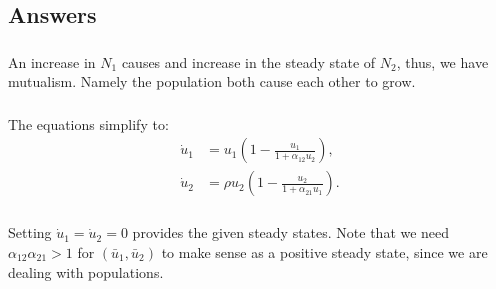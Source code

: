 \documentclass[]{article}
\renewcommand{\l}{\left(}
\renewcommand{\r}{\right)}
\begin{document}
\begin{Answ}
\subsection{Answers}
\subsubsection{}
An increase in $N_1$ causes and increase in the steady state of $N_2$, thus, we have mutualism. Namely the population both cause each other to grow.
\subsubsection{}
The equations simplify to:
\begin{align}
\dot{u}_1&=u_1\l 1-\frac{u_1}{1+\alpha_{12}u_2}\r,\\
\dot{u}_2&=\rho u_2\l 1-\frac{u_2}{1+\alpha_{21}u_1}\r.
\end{align}
\subsubsection{}
Setting $\dot{u}_1=\dot{u}_2=0$ provides the given steady states. Note that we need $\alpha_{12}\alpha_{21}>1$ for $(\bar{u}_1,\bar{u}_2)$ to make sense as a positive steady state, since we are dealing with populations.

\end{Answ}
\end{document}
